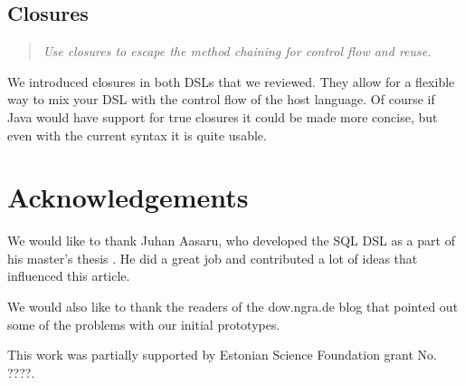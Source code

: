 \documentclass{sig-alternate}
\begin{document}
\subsection{Closures}

\begin{quote}
\emph{Use closures to escape the method chaining for control flow and reuse.}
\end{quote}

We introduced closures in both DSLs that we reviewed. They allow for a flexible way to mix your DSL with the control flow of the host language. Of course if Java would have support for true closures it could be made more concise, but even with the current syntax it is quite usable.



\section{Acknowledgements}

We would like to thank Juhan Aasaru, who developed the SQL DSL as a part of his master's thesis \cite{aasaru2008}. He did a great job and contributed a lot of ideas that influenced this article. 

We would also like to thank the readers of the dow.ngra.de blog that pointed out some of the problems with our initial prototypes.

This work was partially supported by Estonian Science Foundation grant No. ????. 
\end{document}
